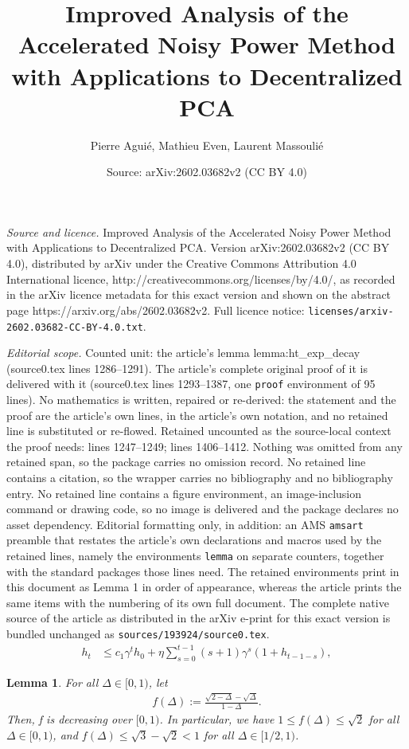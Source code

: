 \documentclass[10pt,a4paper]{amsart}
\title{Improved Analysis of the Accelerated Noisy Power Method with Applications to Decentralized PCA}
\author{Pierre Agui\'e, Mathieu Even, Laurent Massouli\'e}
\date{Source: arXiv:2602.03682v2 (CC BY 4.0)}
\newtheorem{lemma}{Lemma}
\begin{document}
\maketitle

\noindent\emph{Source and licence.} Improved Analysis of the Accelerated Noisy Power Method with Applications to Decentralized PCA. Version arXiv:2602.03682v2 (CC BY 4.0), distributed by arXiv under the Creative Commons Attribution 4.0 International licence, http://creativecommons.org/licenses/by/4.0/, as recorded in the arXiv licence metadata for this exact version and shown on the abstract page https://arxiv.org/abs/2602.03682v2. Full licence notice: \texttt{licenses/arxiv-2602.03682-CC-BY-4.0.txt}.\par\smallskip

\noindent\textit{Editorial scope.} Counted unit: the article's lemma lemma:ht\_exp\_decay (source0.tex lines 1286--1291). The article's complete original proof of it is delivered with it (source0.tex lines 1293--1387, one \texttt{proof} environment of 95 lines). No mathematics is written, repaired or re-derived: the statement and the proof are the article's own lines, in the article's own notation, and no retained line is substituted or re-flowed.  Retained uncounted as the source-local context the proof needs: lines 1247--1249; lines 1406--1412.  Nothing was omitted from any retained span, so the package carries no omission record.  No retained line contains a citation, so the wrapper carries no bibliography and no bibliography entry.  No retained line contains a figure environment, an image-inclusion command or drawing code, so no image is delivered and the package declares no asset dependency.  Editorial formatting only, in addition: an AMS \texttt{amsart} preamble that restates the article's own declarations and macros used by the retained lines, namely the environments \texttt{lemma} on separate counters, together with the standard packages those lines need.  The retained environments print in this document as Lemma 1 in order of appearance, whereas the article prints the same items with the numbering of its own full document.  The complete native source of the article as distributed in the arXiv e-print for this exact version is bundled unchanged as \texttt{sources/193924/source0.tex}.
  \begin{align}\label{eq:ht_reccurence}
    h_t & \leqslant c_1\gamma^t h_0 + \eta \sum_{s=0}^{t-1} (s+1) \gamma^s (1 + h_{t-1-s}),
  \end{align}

\begin{lemma}\label{lemma:f_delta_bounds}
  For all $\Delta \in [0,1)$, let
  \begin{align*}
    f(\Delta) := \frac{\sqrt{2-\Delta} - \sqrt{\Delta}}{1 - \Delta}.
  \end{align*}
  Then, f is decreasing over $[0,1)$. In particular, we have $1 \leqslant f(\Delta) \leqslant \sqrt{2}$ for all $\Delta \in [0,1)$, and $f(\Delta) \leqslant \sqrt{3} - \sqrt{2} < 1$ for all $\Delta \in [1/2, 1)$.
\end{lemma}
\end{document}
